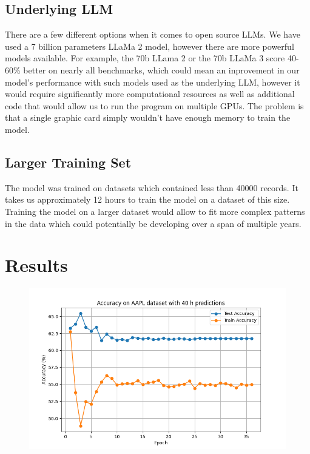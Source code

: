 \subsection{Underlying LLM}
There are a few different options when it comes to open source LLMs. We have used a 7 billion parameters LLaMa 2 model, however there are more powerful models available. For example, the 70b LLama 2 or the 70b LLaMa 3 score 40-60\% better on nearly all benchmarks, which could mean an inprovement in our model's performance with such models used as the underlying LLM, however it would require significantly more computational resources as well as additional code that would allow us to run the program on multiple GPUs. The problem is that a single graphic card simply wouldn't have enough memory to train the model.

\subsection{Larger Training Set}
The model was trained on datasets which contained less than 40000 records. It takes us approximately 12 hours to train the model on a dataset of this size. Training the model on a larger dataset would allow to fit more complex patterns in the data which could potentially be developing over a span of multiple years.

\section{Results}

\begin{figure}[h!]
	\centering
	\includegraphics[width=\linewidth]{"pictures/aapl_40h_results.png"}
	\caption{}
	\label{fig:aapl_fig}
\end{figure}

